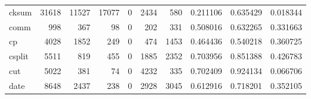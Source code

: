 \begin{longtable}{lrrrrrrrrr}
cksum     &                               31618 &                                           11527 &                                          17077 &                                             0 &                                           2434 &                                          580 &                                           0.211106 &                               0.635429 &                             0.018344 \\
comm      &                                 998 &                                             367 &                                             98 &                                             0 &                                            202 &                                          331 &                                           0.508016 &                               0.632265 &                             0.331663 \\
cp        &                                4028 &                                            1852 &                                            249 &                                             0 &                                            474 &                                         1453 &                                           0.464436 &                               0.540218 &                             0.360725 \\
csplit    &                                5511 &                                             819 &                                            455 &                                             0 &                                           1885 &                                         2352 &                                           0.703956 &                               0.851388 &                             0.426783 \\
cut       &                                5022 &                                             381 &                                             74 &                                             0 &                                           4232 &                                          335 &                                           0.702409 &                               0.924134 &                             0.066706 \\
date      &                                8648 &                                            2437 &                                            238 &                                             0 &                                           2928 &                                         3045 &                                           0.612916 &                               0.718201 &                             0.352105 \\

\end{longtable}
